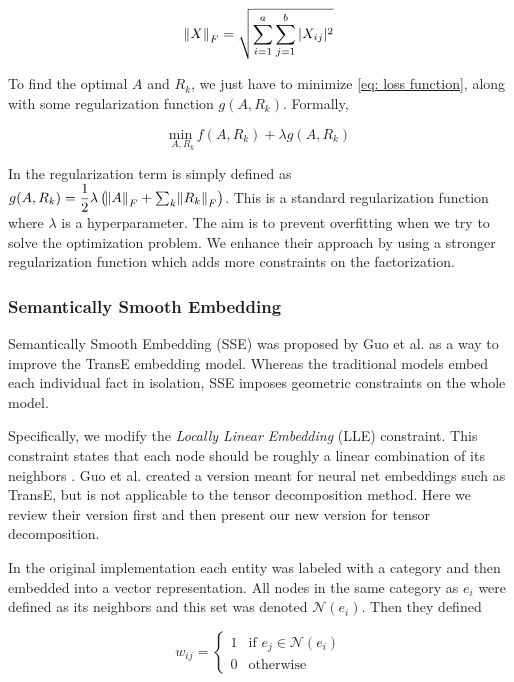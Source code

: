 \documentclass[pageno]{final_paper}
\begin{document}
$$\norm{X}_F = \sqrt{\sum_{i=1}^a \sum_{j=1}^b |X_{ij}|^2}$$

To find the optimal $A$ and $R_k$, we just have to minimize \ref{eq: loss
function}, along with some regularization function $g(A, R_k)$. Formally,

\begin{equation}
    \label{eq: to minimize}
    \underset{A, R_k}{\text{min }} f(A,R_k) + \lambda g(A, R_k)
\end{equation}

In \cite{Nickel2011}\cite{Chang2014} the regularization term is simply defined
as $g(A, R_k) = \dfrac{1}{2}\lambda \left(\norm{A}_F + \sum_k \norm{R_k}_F\right)$. This is
a standard regularization function where $\lambda$ is a hyperparameter. The aim
is to prevent overfitting when we try to solve the optimization problem. We
enhance their approach by using a stronger regularization function which adds
more constraints on the factorization. \\

\subsubsection{Semantically Smooth Embedding}
\label{Semantically Smooth Embedding}

Semantically Smooth Embedding (SSE) was proposed by Guo et al. \cite{Guo2015} as
a way to improve the TransE \cite{Bordes2013} embedding model. Whereas the
traditional models embed each individual fact in isolation, SSE imposes
geometric constraints on the whole model.

Specifically, we modify the \textit{Locally Linear Embedding} (LLE) constraint.
This constraint states that each node should be roughly a linear combination of
its neighbors \cite{Roweis2000}. Guo et al. \cite{Guo2015} created a version
meant for neural net embeddings such as TransE, but is not applicable to the
tensor decomposition method. Here we review their version first and then present
our new version for tensor decomposition.

In the original implementation each entity was labeled with a category and
then embedded into a vector representation. All nodes in the same category as
$e_i$ were defined as its neighbors and this set was denoted $\mathcal{N}(e_i)$.
Then they defined

$$
w_{ij} =
\begin{cases}
    1 & \text{if } e_j \in \mathcal{N}(e_i) \\
    0 & \text{otherwise}
\end{cases}
$$
\end{document}
